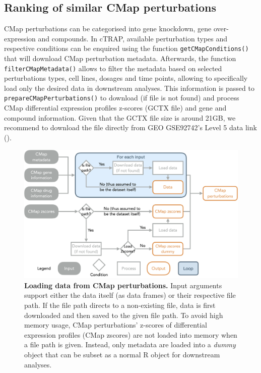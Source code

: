 \subsection{Ranking of similar CMap perturbations}

CMap perturbations can be categorised into gene knockdown, gene over-expression and compounds. In cTRAP, available perturbation types and respective conditions can be enquired using the function \texttt{getCMapConditions()} that will download CMap perturbation metadata. Afterwards, the function \texttt{filterCMapMetadata()} allows to filter the metadata based on selected perturbations types, cell lines, dosages and time points, allowing to specifically load only the desired data in downstream analyses. This information is passed to \texttt{prepareCMapPerturbations()} to download (if file is not found) and process CMap differential expression profiles z-scores (GCTX file) and gene and compound information. Given that the GCTX file size is around 21GB, we recommend to download the file directly from GEO GSE92742’s Level 5 data link ().

\begin{figure}[!ht]
  \includegraphics[width=.8\textwidth]{images/ctrap/cmap-perturbations}
  \centering
  \caption[Loading data from CMap perturbations]{\textbf{Loading data from CMap perturbations.} Input arguments support either the data itself (as data frames) or their respective file path. If the file path directs to a non-existing file,  data is first downloaded and then saved to the given file path. To avoid high memory usage, CMap perturbations' z-scores of differential expression profiles (CMap zscores) are not loaded into memory when a file path is given. Instead, only metadata are loaded into a \emph{dummy} object that can be subset as a normal R object for downstream analyses.}
  \label{fig:ctrap-cmap-perturbations}
\end{figure}

